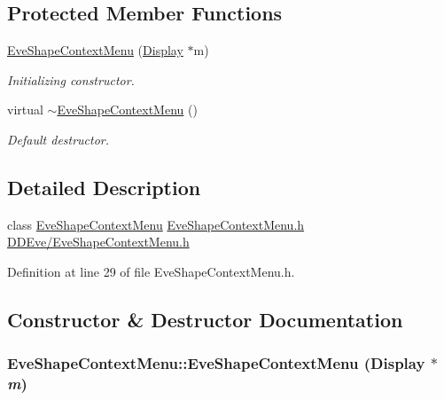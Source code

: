 \subsection*{Protected Member Functions}
\begin{DoxyCompactItemize}
\item 
\hyperlink{class_d_d4hep_1_1_eve_shape_context_menu_a45482ef4f23d382d734b7a97c9f5ca22}{EveShapeContextMenu} (\hyperlink{class_d_d4hep_1_1_display}{Display} $\ast$m)
\begin{DoxyCompactList}\small\item\em Initializing constructor. \item\end{DoxyCompactList}\item 
virtual \hyperlink{class_d_d4hep_1_1_eve_shape_context_menu_a9e82222657b2932cbdaacf941ca68359}{$\sim$EveShapeContextMenu} ()
\begin{DoxyCompactList}\small\item\em Default destructor. \item\end{DoxyCompactList}\end{DoxyCompactItemize}


\subsection{Detailed Description}
class \hyperlink{class_d_d4hep_1_1_eve_shape_context_menu}{EveShapeContextMenu} \hyperlink{_eve_shape_context_menu_8h}{EveShapeContextMenu.h} \hyperlink{_eve_shape_context_menu_8h}{DDEve/EveShapeContextMenu.h} 

Definition at line 29 of file EveShapeContextMenu.h.

\subsection{Constructor \& Destructor Documentation}
\hypertarget{class_d_d4hep_1_1_eve_shape_context_menu_a45482ef4f23d382d734b7a97c9f5ca22}{
\subsubsection[{EveShapeContextMenu}]{\setlength{\rightskip}{0pt plus 5cm}EveShapeContextMenu::EveShapeContextMenu ({\bf Display} $\ast$ {\em m})}}
\label{class_d_d4hep_1_1_eve_shape_context_menu_a45482ef4f23d382d734b7a97c9f5ca22}


